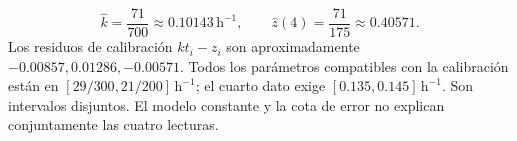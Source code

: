 \[
\widehat k=\frac{71}{700}\approx0.10143\,\mathrm h^{-1},\qquad
\widehat z(4)=\frac{71}{175}\approx0.40571.
\]
Los residuos de calibración \(kt_i-z_i\) son aproximadamente \(-0.00857,0.01286,-0.00571\). Todos los parámetros compatibles con la calibración están en \([29/300,21/200]\,\mathrm h^{-1}\); el cuarto dato exige \([0.135,0.145]\,\mathrm h^{-1}\). Son intervalos disjuntos. El modelo constante y la cota de error no explican conjuntamente las cuatro lecturas.
